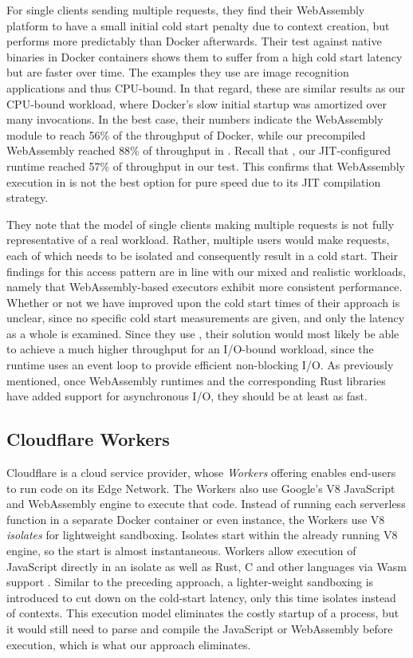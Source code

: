For single clients sending multiple requests, they find their WebAssembly platform to have a small initial cold start penalty due to context creation, but performs more predictably than Docker afterwards. Their test against native binaries in Docker containers shows them to suffer from a high cold start latency but are faster over time. The examples they use are image recognition applications and thus CPU-bound. In that regard, these are similar results as our CPU-bound workload, where Docker's slow initial startup was amortized over many invocations.
In the best case, their numbers indicate the WebAssembly module to reach 56\% of the throughput of Docker, while our precompiled WebAssembly reached 88\% of throughput in . Recall that , our JIT-configured runtime reached 57\% of throughput in our test. This confirms that WebAssembly execution in  is not the best option for pure speed due to its JIT compilation strategy.

They note that the model of single clients making multiple requests is not fully representative of a real workload. Rather, multiple users would make requests, each of which needs to be isolated and consequently result in a cold start. Their findings for this access pattern are in line with our mixed and realistic workloads, namely that WebAssembly-based executors exhibit more consistent performance. Whether or not we have improved upon the cold start times of their approach is unclear, since no specific cold start measurements are given, and only the latency as a whole is examined. 
Since they use , their solution would most likely be able to achieve a much higher throughput for an I/O-bound workload, since the runtime uses an event loop to provide efficient non-blocking I/O. As previously mentioned, once WebAssembly runtimes and the corresponding Rust libraries have added support for asynchronous I/O, they should be at least as fast.

\subsection{Cloudflare Workers}

Cloudflare is a cloud service provider, whose \emph{Workers} offering enables end-users to run code on its Edge Network. The Workers also use Google's V8 JavaScript and WebAssembly engine to execute that code.
Instead of running each serverless function in a separate Docker container or even  instance, the Workers use V8 \emph{isolates} for lightweight sandboxing. Isolates start within the already running V8 engine, so the start is almost instantaneous.
Workers allow execution of JavaScript directly in an isolate as well as Rust, C and other languages via Wasm support \cite{Cloudflare2021}.
Similar to the preceding approach, a lighter-weight sandboxing is introduced to cut down on the cold-start latency, only this time isolates instead of contexts. This execution model eliminates the costly startup of a  process, but it would still need to parse and compile the JavaScript or WebAssembly before execution, which is what our approach eliminates.

